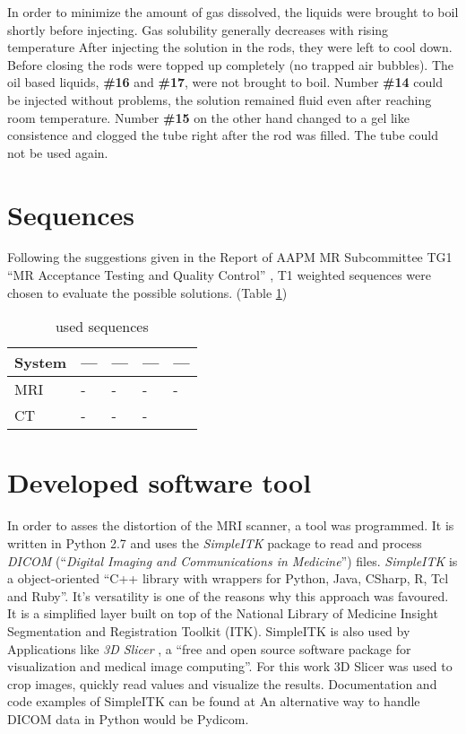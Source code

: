 In order to minimize the amount of gas dissolved, the liquids were brought to boil shortly before injecting. Gas solubility generally decreases with rising temperature \cite{Henry1803, Sander2015}
After injecting the solution in the rods, they were left to cool down. Before closing the rods were topped up completely (no trapped air bubbles).
The oil based liquids, \textbf{\#16} and \textbf{\#17}, were not brought to boil.
Number \textbf{\#14} could be injected without problems, the solution remained fluid even after reaching room temperature.
Number \textbf{\#15} on the other hand changed to a gel like consistence and clogged the tube right after the rod was filled. The tube could not be used again.



\section{Sequences}

Following the suggestions given in the Report of AAPM MR Subcommittee TG1 ``MR Acceptance Testing and
Quality Control'' \cite{Jackson2009}, T1 weighted sequences were chosen to evaluate the possible solutions. (Table \ref{tab:settings})

\begin{table}[h]
\centering
\begin{tabular}{@{}lllll@{}}
System & ---  & --- &  --- & --- \\
\toprule
MRI    & -   & -   & -   & -    \\
CT     & -   & -   & -   &
\end{tabular}
\caption{used sequences}
\label{tab:settings}
\end{table}

\section{Developed software tool}

In order to asses the distortion of the MRI scanner, a tool was programmed.
It is written in Python 2.7 and uses the \textit{SimpleITK} package to read and process \textit{DICOM} (``\textit{Digital Imaging and Communications in Medicine}'') files. \cite{Python, DICOM}
\textit{SimpleITK} is a object-oriented ``C++ library with wrappers for Python, Java, CSharp, R, Tcl and Ruby''. \cite{SimpleITK, SimpleITK_started} It's versatility is one of the reasons why this approach was favoured.
It is a simplified layer built on top of the National Library of Medicine Insight Segmentation and Registration Toolkit (ITK). SimpleITK is also used by Applications like \textit{3D Slicer} , a ``free and open source software package for
visualization and medical image computing''. \cite{3DSlicer, Kikinis2012} For this work 3D Slicer was used to crop images, quickly read values and visualize the results.
Documentation and code examples of SimpleITK can be found at \cite{InsightSoftwareConsortium, Kyriakou-SimpleITK}
An alternative way to handle DICOM data in Python would be Pydicom. \cite{Pydicom, Kyriakou-Pydicom-VTK} 

